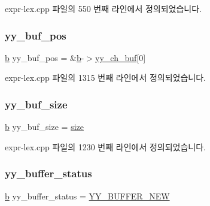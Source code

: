 expr-\/lex.\+cpp 파일의 550 번째 라인에서 정의되었습니다.

\mbox{\label{expr-lex_8cpp_a4eab751080565d2d6e83560583d15d1c}} 
\subsubsection{\texorpdfstring{yy\+\_\+buf\+\_\+pos}{yy\_buf\_pos}}
{\footnotesize\ttfamily \mbox{\hyperlink{expr-lex_8cpp_a91b64995742fd30063314f12340b4b5a}{b}} yy\+\_\+buf\+\_\+pos = \&\mbox{\hyperlink{expr-lex_8cpp_a91b64995742fd30063314f12340b4b5a}{b}}-\/$>$\mbox{\hyperlink{expr-lex_8cpp_a49f3339224f2ff52f9191b351b184dbd}{yy\+\_\+ch\+\_\+buf}}\mbox{[}0\mbox{]}}



expr-\/lex.\+cpp 파일의 1315 번째 라인에서 정의되었습니다.

\mbox{\label{expr-lex_8cpp_a969f40813585d053e9cceaec3fe16f58}} 
\subsubsection{\texorpdfstring{yy\+\_\+buf\+\_\+size}{yy\_buf\_size}}
{\footnotesize\ttfamily \mbox{\hyperlink{expr-lex_8cpp_a91b64995742fd30063314f12340b4b5a}{b}} yy\+\_\+buf\+\_\+size = \mbox{\hyperlink{expr-lex_8cpp_ab7d671599a7b25ca99a487fa341bc33a}{size}}}



expr-\/lex.\+cpp 파일의 1230 번째 라인에서 정의되었습니다.

\mbox{\label{expr-lex_8cpp_a44b78dddb082281d797f84223687c7e1}} 
\subsubsection{\texorpdfstring{yy\+\_\+buffer\+\_\+status}{yy\_buffer\_status}}
{\footnotesize\ttfamily \mbox{\hyperlink{expr-lex_8cpp_a91b64995742fd30063314f12340b4b5a}{b}} yy\+\_\+buffer\+\_\+status = \mbox{\hyperlink{expr-lex_8cpp_a53579db42834b88199458993912c646d}{Y\+Y\+\_\+\+B\+U\+F\+F\+E\+R\+\_\+\+N\+EW}}}



